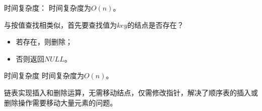 \begin{frame}[fragile]

\end{frame}

\begin{frame}[fragile]

\end{frame}

\begin{frame}[fragile]
\textcolor{acolor5}{时间复杂度：}
时间复杂度为$O(n)$。
 

\end{frame}


\begin{frame}

与按值查找相类似，首先要查找值为$key$的结点是否存在？
\begin{itemize}
\item 若存在，则删除；
\item 否则返回$NULL$。
\end{itemize}

\end{frame}

\begin{frame}[fragile]

\end{frame}

\begin{frame}[fragile]

\end{frame}
%
\begin{frame}[fragile]

\textcolor{acolor5}{时间复杂度}
时间复杂度为$O(n)$。
\end{frame}

\begin{frame}[fragile]
链表实现插入和删除运算，无需移动结点，仅需修改指针，解决了顺序表的插入或删除操作需要移动大量元素的问题。
\end{frame}

